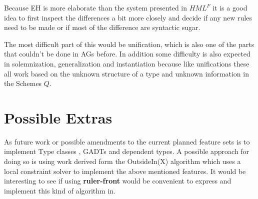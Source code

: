 \documentclass[12pt, a4paper, oneside]{article}
\begin{document}
Because EH is more elaborate than the system presented in \textit{$HML^F$} it is a good idea to first inspect the differences a bit more closely and decide if any new rules need to be made or if most of the difference are syntactic sugar.

The most difficult part of this would be unification, which is also one of the parts that couldn't be done in AGs before. In addition some difficulty is also expected in solemnization, generalization and instantiation because like unifications these all work based on the unknown structure of a type and unknown information in the Schemes $Q$.

\section{Possible Extras}
As future work or possible amendments to the current planned feature sets is to implement Type classes , GADTs and dependent types. A possible approach for doing so is using work derived form the OutsideIn(X)\cite{outsidein} algorithm which uses a local constraint solver to implement the above mentioned features. It would be interesting to see if using \textbf{ruler-front} would be convenient to express and implement this kind of algorithm in.
\end{document}
